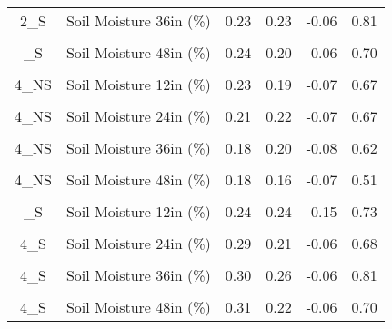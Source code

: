 \begin{table}[!h]
{\begin{tabular}[t]{cccccc}
2\_S & Soil Moisture 36in (\%) & 0.23 & 0.23 & -0.06 & 0.81\\
\cellcolor{gray!10}{2\_S} & \cellcolor{gray!10}{Soil Moisture 42in (\%)} & \cellcolor{gray!10}{0.23} & \cellcolor{gray!10}{0.19} & \cellcolor{gray!10}{-0.06} & \cellcolor{gray!10}{0.70}\\
\addlinespace
2\_S & Soil Moisture 48in (\%) & 0.24 & 0.20 & -0.06 & 0.70\\
\cellcolor{gray!10}{4\_NS} & \cellcolor{gray!10}{Soil Moisture 6in (\%)} & \cellcolor{gray!10}{0.20} & \cellcolor{gray!10}{0.19} & \cellcolor{gray!10}{-0.05} & \cellcolor{gray!10}{0.75}\\
4\_NS & Soil Moisture 12in (\%) & 0.23 & 0.19 & -0.07 & 0.67\\
\cellcolor{gray!10}{4\_NS} & \cellcolor{gray!10}{Soil Moisture 18in (\%)} & \cellcolor{gray!10}{0.24} & \cellcolor{gray!10}{0.24} & \cellcolor{gray!10}{-0.07} & \cellcolor{gray!10}{0.74}\\
4\_NS & Soil Moisture 24in (\%) & 0.21 & 0.22 & -0.07 & 0.67\\
\addlinespace
\cellcolor{gray!10}{4\_NS} & \cellcolor{gray!10}{Soil Moisture 30in (\%)} & \cellcolor{gray!10}{0.19} & \cellcolor{gray!10}{0.19} & \cellcolor{gray!10}{-0.06} & \cellcolor{gray!10}{0.62}\\
4\_NS & Soil Moisture 36in (\%) & 0.18 & 0.20 & -0.08 & 0.62\\
\cellcolor{gray!10}{4\_NS} & \cellcolor{gray!10}{Soil Moisture 42in (\%)} & \cellcolor{gray!10}{0.19} & \cellcolor{gray!10}{0.20} & \cellcolor{gray!10}{-0.06} & \cellcolor{gray!10}{0.63}\\
4\_NS & Soil Moisture 48in (\%) & 0.18 & 0.16 & -0.07 & 0.51\\
\cellcolor{gray!10}{4\_S} & \cellcolor{gray!10}{Soil Moisture 6in (\%)} & \cellcolor{gray!10}{0.27} & \cellcolor{gray!10}{0.18} & \cellcolor{gray!10}{-0.05} & \cellcolor{gray!10}{0.61}\\
\addlinespace
4\_S & Soil Moisture 12in (\%) & 0.24 & 0.24 & -0.15 & 0.73\\
\cellcolor{gray!10}{4\_S} & \cellcolor{gray!10}{Soil Moisture 18in (\%)} & \cellcolor{gray!10}{0.29} & \cellcolor{gray!10}{0.20} & \cellcolor{gray!10}{-0.06} & \cellcolor{gray!10}{0.63}\\
4\_S & Soil Moisture 24in (\%) & 0.29 & 0.21 & -0.06 & 0.68\\
\cellcolor{gray!10}{4\_S} & \cellcolor{gray!10}{Soil Moisture 30in (\%)} & \cellcolor{gray!10}{0.31} & \cellcolor{gray!10}{0.25} & \cellcolor{gray!10}{-0.05} & \cellcolor{gray!10}{0.81}\\
4\_S & Soil Moisture 36in (\%) & 0.30 & 0.26 & -0.06 & 0.81\\
\addlinespace
\cellcolor{gray!10}{4\_S} & \cellcolor{gray!10}{Soil Moisture 42in (\%)} & \cellcolor{gray!10}{0.30} & \cellcolor{gray!10}{0.21} & \cellcolor{gray!10}{-0.06} & \cellcolor{gray!10}{0.70}\\
4\_S & Soil Moisture 48in (\%) & 0.31 & 0.22 & -0.06 & 0.70\\
\bottomrule
\end{tabular}}
\end{table}

